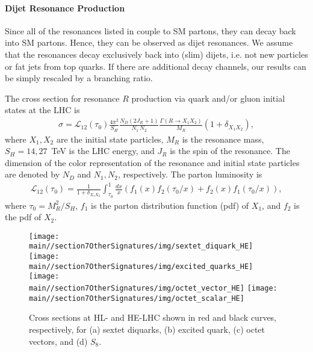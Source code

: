 \paragraph*{Dijet Resonance Production}
\label{par:2j}
Since all of the resonances listed in  couple to SM partons, they can decay back into SM partons.  Hence, they can be observed as dijet resonances.  We assume that the resonances decay exclusively back into (slim) dijets, i.e. not new particles or fat jets from top quarks.  If there are additional decay channels, our results can be simply rescaled by a branching ratio.
 
The cross section for resonance $R$ production via quark and/or gluon initial states at the LHC is
\begin{eqnarray}
\sigma =\mathcal{L}_{12}(\tau_0)\frac{4\pi^2}{S_H}\frac{N_D(2J_R+1)}{N_1\,N_2}\frac{\Gamma(R\rightarrow X_1 X_2)}{M_R}(1+\delta_{X_1X_2}),
\end{eqnarray}
where $X_1,X_2$ are the initial state particles, $M_R$ is the resonance mass, $S_H=14,27$~TeV is the LHC energy, and $J_R$ is the spin of the resonance.  The dimension of the color representation of the resonance and initial state particles are denoted by $N_D$ and $N_1,N_2$, respectively.  The parton luminosity is
\begin{eqnarray}
\mathcal{L}_{12}(\tau_0)=\frac{1}{1+\delta_{X_1X_2}}\int^1_{\tau_0} \frac{dx}{x}\left(f_1(x)f_2(\tau_0/x)+f_2(x)f_1(\tau_0/x)\right),
\end{eqnarray}
where $\tau_0=M_R^2/S_H$, $f_1$ is the parton distribution function (pdf) of $X_1$, and $f_2$ is the pdf of $X_2$.





\begin{figure}[tb]
\centering
\texttt{[image: \\main//section7OtherSignatures/img/sextet\_diquark\_HE]}
\texttt{[image: \\main//section7OtherSignatures/img/excited\_quarks\_HE]}
\texttt{[image: \\main//section7OtherSignatures/img/octet\_vector\_HE]}
\texttt{[image: \\main//section7OtherSignatures/img/octet\_scalar\_HE]}
\caption{Cross sections at HL- and HE-LHC shown in red and black curves, respectively, for (a) sextet diquarks, (b) excited quark, (c) octet vectors, and (d) $S_8$.}\label{fig:res}
\end{figure}


